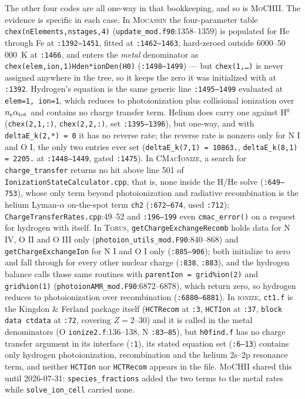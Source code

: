 \documentclass[english,a4paper]{my_memo}
\newcommand{\code}[1]{\texttt{#1}}
\newcommand{\MoCHII}{\textsc{MoCHII}}
\newcommand{\Wood}{\textsc{ionize}}
\newcommand{\CMI}{\textsc{CMacIonize}}
\newcommand{\Torus}{\textsc{Torus}}
\newcommand{\Mocassin}{\textsc{Mocassin}}
\newcommand{\nelec}{n_{\rm e}}
\begin{document}
The other four codes are all one-way in that bookkeeping, and so is
\MoCHII{}.  The evidence is specific in each case.  In \Mocassin{} the
four-parameter table \code{chex(nElements,\allowbreak nstages,4)}
(\code{update\_\allowbreak mod.f90}:1358--1359) is populated for He through Fe at
\code{:1392--1451}, fitted at \code{:1462--1463}, hard-zeroed outside
6000--50\,000~K at \code{:1466}, and enters the \emph{metal} denominator as
\code{chex(elem,ion,1)\allowbreak *Hden*ionDen(H0)} (\code{:1498--1499}) --- but
\code{chex(1,\dots)} is never assigned anywhere in the tree, so it keeps the
zero it was initialized with at \code{:1392}.  Hydrogen's equation is the
same generic line \code{:1495--1499} evaluated at \code{elem=1, ion=1}, which
reduces to photoionization plus collisional ionization over
$\nelec\alpha_{\rm tot}$ and contains no charge transfer term.  Helium does
carry one against H$^0$ (\code{chex(2,1,:)}, \code{chex(2,2,:)}, set
\code{:1395--1396}), but one-way, and with \code{deltaE\_k(2,*) = 0} it has no
reverse rate; the reverse rate is nonzero only for N I and O I, the only two
entries ever set (\code{deltaE\_k(7,1) = 10863.},
\code{deltaE\_k(8,1) = 2205.} at \code{:1448--1449}, gated \code{:1475}).  In
\CMI{}, a search for \code{charge\_transfer} returns no hit above line 501 of
\code{Ionization\allowbreak State\allowbreak Calculator.cpp}, that is, none inside the H/He solve
(\code{:649--753}), whose only term beyond photoionization and radiative
recombination is the helium Lyman-$\alpha$ on-the-spot term \code{ch2}
(\code{:672--674}, used \code{:712}); \code{Charge\allowbreak Transfer\allowbreak Rates.cpp}:49--52
and \code{:196--199} even \code{cmac\_error()} on a request for hydrogen with
itself.  In \Torus{}, \code{get\allowbreak Charge\allowbreak Exchange\allowbreak Recomb} holds data for N IV,
O II and O III only (\code{photoion\_\allowbreak utils\_\allowbreak mod.F90}:840--868) and
\code{get\allowbreak Charge\allowbreak Exchange\allowbreak Ion} for N I and O I only (\code{:885--906}); both
initialize to zero and fall through for every other nuclear charge
(\code{:838}, \code{:883}), and the hydrogen balance calls those same
routines with \code{parentIon = grid\%ion(2)} and \code{grid\%ion(1)}
(\code{photoion\allowbreak AMR\_\allowbreak mod.F90}:6872--6878), which return zero, so hydrogen
reduces to photoionization over recombination (\code{:6880--6881}).  In
\Wood{}, \code{ct1.f} is the Kingdon \& Ferland package itself
(\code{HCTRecom} at \code{:3}, \code{HCTIon} at \code{:37},
\code{block data ctdata} at \code{:72}, covering $Z = 2$--30) and it is
called in the metal denominators (O \code{ionize2.f}:136--138, N
\code{:83--85}), but \code{h0find.f} has no charge transfer argument in its
interface (\code{:1}), its stated equation set (\code{:6--13}) contains only
hydrogen photoionization, recombination and the helium 2s--2p resonance term,
and neither \code{HCTIon} nor \code{HCTRecom} appears in the file.  \MoCHII{} shared this
until 2026-07-31: \code{species\_fractions} added the two terms to the metal
rates while \code{solve\_ion\_cell} carried none.
\end{document}
